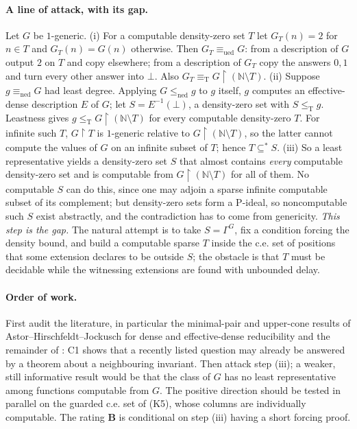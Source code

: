 \documentclass[11pt,a4paper]{article}
\newcommand{\N}{\mathbb N}
\newcommand{\leT}{\leq_{\mathrm T}}
\newcommand{\eqT}{\equiv_{\mathrm T}}
\newcommand{\W}{\textbf{B}}\newcommand{\E}{\textbf{E}}\newcommand{\Lr}{\textbf{H}}
\theoremstyle{definition}\newtheorem{definition}[theorem]{Definition}
\theoremstyle{remark}\newtheorem{remark}[theorem]{Remark}
\begin{document}
\paragraph{A line of attack, with its gap.} Let $G$ be $1$-generic. (i) For a computable density-zero set $T$ let $G_T(n)=2$ for $n\in T$ and $G_T(n)=G(n)$ otherwise. Then $G_T\equiv_{\mathrm{ued}}G$: from a description of $G$ output $2$ on $T$ and copy elsewhere; from a description of $G_T$ copy the answers $0,1$ and turn every other answer into $\bot$. Also $G_T\eqT G\upharpoonright(\N\setminus T)$. (ii) Suppose $g\equiv_{\mathrm{ned}}G$ had least degree. Applying $G\le_{\mathrm{ned}}g$ to $g$ itself, $g$ computes an effective-dense description $E$ of $G$; let $S=E^{-1}(\bot)$, a density-zero set with $S\leT g$. Leastness gives $g\leT G\upharpoonright(\N\setminus T)$ for every computable density-zero $T$. For infinite such $T$, $G\upharpoonright T$ is $1$-generic relative to $G\upharpoonright(\N\setminus T)$, so the latter cannot compute the values of $G$ on an infinite subset of $T$; hence $T\subseteq^*S$. (iii) So a least representative yields a density-zero set $S$ that almost contains \emph{every} computable density-zero set and is computable from $G\upharpoonright(\N\setminus T)$ for all of them. No computable $S$ can do this, since one may adjoin a sparse infinite computable subset of its complement; but density-zero sets form a P-ideal, so noncomputable such $S$ exist abstractly, and the contradiction has to come from genericity. \emph{This step is the gap.} The natural attempt is to take $S=\Gamma^G$, fix a condition forcing the density bound, and build a computable sparse $T$ inside the c.e. set of positions that some extension declares to be outside $S$; the obstacle is that $T$ must be decidable while the witnessing extensions are found with unbounded delay.

\paragraph{Order of work.} First audit the literature, in particular the minimal-pair and upper-cone results of Astor--Hirschfeldt--Jockusch for dense and effective-dense reducibility \cite{AHJ} and the remainder of \cite{Gerdes}: C1 shows that a recently listed question may already be answered by a theorem about a neighbouring invariant. Then attack step (iii); a weaker, still informative result would be that the class of $G$ has no least representative among functions computable from $G$. The positive direction should be tested in parallel on the guarded c.e. set of (K5), whose columns are individually computable. The rating \W{} is conditional on step (iii) having a short forcing proof.
\end{document}
